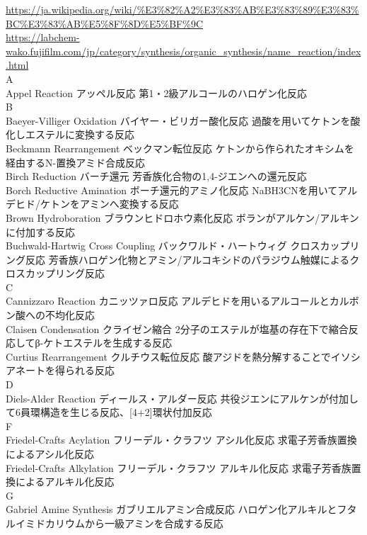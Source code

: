 \documentclass[dvipdfmx,uplatex]{jsarticle}
\begin{document}
\newpage
\url{https://ja.wikipedia.org/wiki/%E3%82%A2%E3%83%AB%E3%83%89%E3%83%BC%E3%83%AB%E5%8F%8D%E5%BF%9C} \\
\url{https://labchem-wako.fujifilm.com/jp/category/synthesis/organic_synthesis/name_reaction/index.html} \\
\small
A \\
Appel Reaction	アッペル反応
	第1・2級アルコールのハロゲン化反応 \\
B \\
Baeyer-Villiger Oxidation	バイヤー・ビリガー酸化反応
	過酸を用いてケトンを酸化しエステルに変換する反応 \\
Beckmann Rearrangement	ベックマン転位反応
	ケトンから作られたオキシムを経由するN-置換アミド合成反応 \\
Birch Reduction	バーチ還元
	芳香族化合物の1,4-ジエンへの還元反応 \\
Borch Reductive Amination	ボーチ還元的アミノ化反応
	NaBH3CNを用いてアルデヒド/ケトンをアミンへ変換する反応 \\
Brown Hydroboration	ブラウンヒドロホウ素化反応
	ボランがアルケン/アルキンに付加する反応 \\
Buchwald-Hartwig Cross Coupling	バックワルド・ハートウィグ クロスカップリング反応
	芳香族ハロゲン化物とアミン/アルコキシドのパラジウム触媒によるクロスカップリング反応 \\
C \\
Cannizzaro Reaction	カニッツァロ反応
	アルデヒドを用いるアルコールとカルボン酸への不均化反応 \\
Claisen Condensation	クライゼン縮合
	2分子のエステルが塩基の存在下で縮合反応してβ-ケトエステルを生成する反応 \\
Curtius Rearrangement	クルチウス転位反応
	酸アジドを熱分解することでイソシアネートを得られる反応 \\
D \\
Diels-Alder Reaction	ディールス・アルダー反応
	共役ジエンにアルケンが付加して6員環構造を生じる反応、[4+2]環状付加反応 \\
F \\
Friedel-Crafts Acylation	フリーデル・クラフツ アシル化反応
	求電子芳香族置換によるアシル化反応 \\
Friedel-Crafts Alkylation	フリーデル・クラフツ アルキル化反応
	求電子芳香族置換によるアルキル化反応 \\
G \\
Gabriel Amine Synthesis	ガブリエルアミン合成反応
	ハロゲン化アルキルとフタルイミドカリウムから一級アミンを合成する反応 \\
\end{document}

